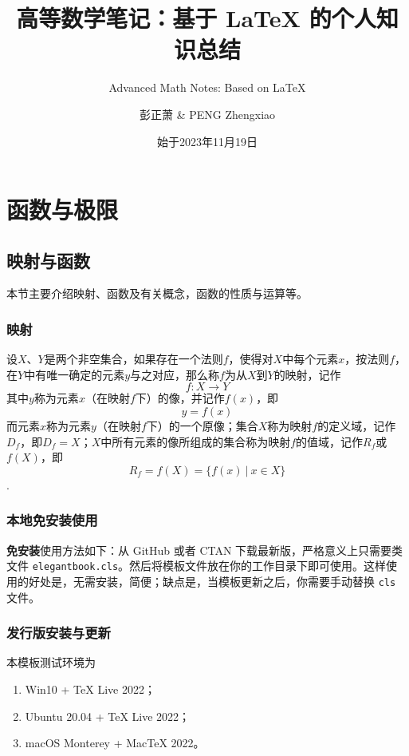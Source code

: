 \documentclass[lang=cn,10pt]{elegantbook}
\title{高等数学笔记：基于 \LaTeX{} 的个人知识总结}
\subtitle{Advanced Math Notes: Based on \LaTeX{}}
\author{彭正萧 \& PENG Zhengxiao}
\institute{西北农林科技大学}
\date{始于2023年11月19日}
\begin{document}
\maketitle
\frontmatter

\tableofcontents

\mainmatter

\chapter{函数与极限}

\section{映射与函数}

本节主要介绍映射、函数及有关概念，函数的性质与运算等。

\subsection{映射}

\begin{definition}
	设\(X\)、\( Y \)是两个非空集合，如果存在一个法则\( f \)，使得对\( X \)中每个元素\( x \)，按法则\( f \)，在\( Y \)中有唯一确定的元素\( y \)与之对应，那么称\( f \)为从\( X \)到\( Y \)的映射，记作
	\[ f:X \rightarrow Y \]
	其中\( y \)称为元素\( x \)（在映射\( f \)下）的像，并记作\( f(x) \)，即
	\[ y = f(x) \]
	而元素\( x \)称为元素\( y \)（在映射\( f \)下）的一个原像；集合\( X \)称为映射\( f \)的定义域，记作\( D_{f} \)，即\( D_{f} = X \)；\( X \)中所有元素的像所组成的集合称为映射\( f \)的值域，记作\( R_{f} \)或\( f(X) \)，即
	\[ R_{f} = f(X) = \{ f(x)\ |\ x \in X\}\].
\end{definition}

\subsection{本地免安装使用}

\textbf{免安装}使用方法如下：从 GitHub 或者 CTAN 下载最新版，严格意义上只需要类文件 \lstinline{elegantbook.cls}。然后将模板文件放在你的工作目录下即可使用。这样使用的好处是，无需安装，简便；缺点是，当模板更新之后，你需要手动替换 \lstinline{cls} 文件。

\subsection{发行版安装与更新}

本模板测试环境为 
\begin{enumerate}
  \item Win10 + \TeX{} Live 2022；
  \item Ubuntu 20.04 + \TeX{} Live 2022；
  \item macOS Monterey + Mac\TeX{} 2022。
\end{enumerate}
\end{document}
